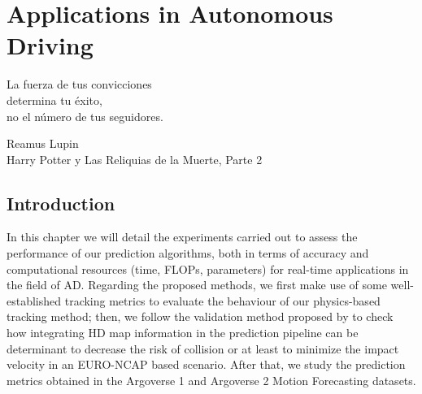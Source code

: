 % 
% 
% 
% 
% 
% 
% 

\chapter{Applications in Autonomous Driving}
\label{cha:applications_in_autonomous_driving}

\begin{FraseCelebre}
	\begin{Frase}
		La fuerza de tus convicciones \\
		determina tu éxito, \\
		no el número de tus seguidores.
	\end{Frase}
	\begin{Fuente}
		Reamus Lupin \\
		Harry Potter y Las Reliquias de la Muerte, Parte 2
	\end{Fuente}
\end{FraseCelebre}

\section{Introduction}
\label{sec:8_introduction}

In this chapter we will detail the experiments carried out to assess the performance of our prediction algorithms, both in terms of accuracy and computational resources (time, \acp{FLOP}, parameters) for real-time applications in the field of \ac{AD}. Regarding the proposed methods, we first make use of some well-established tracking metrics to evaluate the behaviour of our physics-based tracking method; then, we follow the validation method proposed by \cite{gutierrez2021validation} to check how integrating HD map information in the prediction pipeline can be determinant to decrease the risk of collision or at least to minimize the impact velocity in an EURO-NCAP based scenario. After that, we study the prediction metrics obtained in the Argoverse 1 \cite{chang2019argoverse} and Argoverse 2 \cite{wilson2023argoverse} Motion Forecasting datasets. 

